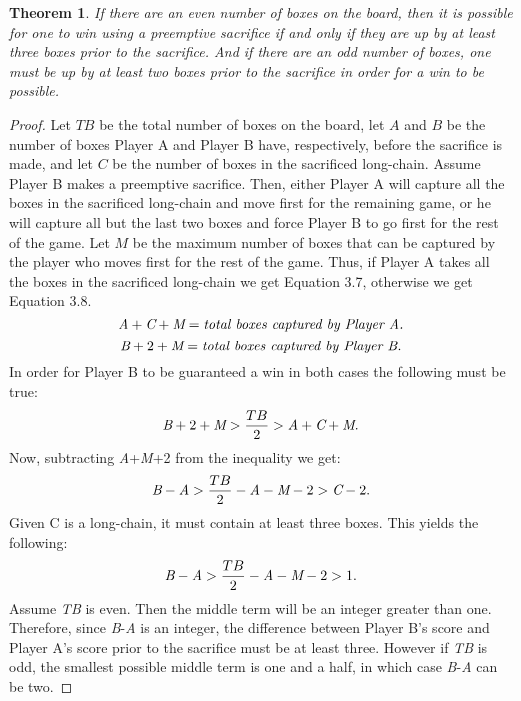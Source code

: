 \documentclass[12pt,twoside]{reedthesis}
\newtheorem{theorem}{Theorem}
\begin{document}
\begin{theorem}
If there are an even number of boxes on the board, then it is possible for one to win using a preemptive sacrifice if and only if they are up by at least three boxes prior to the sacrifice.  And if there are an odd number of boxes, one must be up by at least two boxes prior to the sacrifice in order for a win to be possible.
\end{theorem}

\begin{proof}
Let $TB$ be the total number of boxes on the board, let $A$ and $B$ be the number of boxes Player A and Player B have, respectively, before the sacrifice is made, and let $C$ be the number of boxes in the sacrificed long-chain.  Assume Player B makes a preemptive sacrifice.  Then, either Player A will capture all the boxes in the sacrificed long-chain and move first for the remaining game, or he will capture all but the last two boxes and force Player B to go first for the rest of the game.  Let $M$ be the maximum number of boxes that can be captured by the player who moves first for the rest of the game.  Thus, if Player A takes all the boxes in the sacrificed long-chain we get Equation 3.7, otherwise we get Equation 3.8.
\begin{equation}
\emph{A} + \emph{C} + \emph{M} = \textit{total boxes captured by Player A.}
\end{equation}
\begin{equation}
\emph{B} + 2 + \emph{M} = \textit{total boxes captured by Player B.}
\end{equation}
In order for Player B to be guaranteed a win in both cases the following must be true:
\begin{equation}
\emph{B} + 2 + \emph{M} > \frac{TB}{2} > \emph{A} + \emph{C} + \emph{M}.
\end{equation}
Now, subtracting \emph{A}+\emph{M}+2 from the inequality we get:
\begin{equation}
\emph{B} - \emph{A} > \frac{TB}{2} - \emph{A} - \emph{M} - 2 > \emph{C} - 2.
\end{equation}
Given C is a long-chain, it must contain at least three boxes.  This yields the following:
\begin{equation}
\emph{B} - \emph{A} > \frac{TB}{2} - \emph{A} - \emph{M} - 2 > 1.
\end{equation}
Assume \emph{TB} is even.  Then the middle term will be an integer greater than one.  Therefore, since \emph{B}-\emph{A} is an integer, the difference between Player B's score and Player A's score prior to the sacrifice must be at least three.  However if \emph{TB} is odd, the smallest possible middle term is one and a half, in which case \emph{B}-\emph{A} can be two.
\end{proof}
\end{document}
